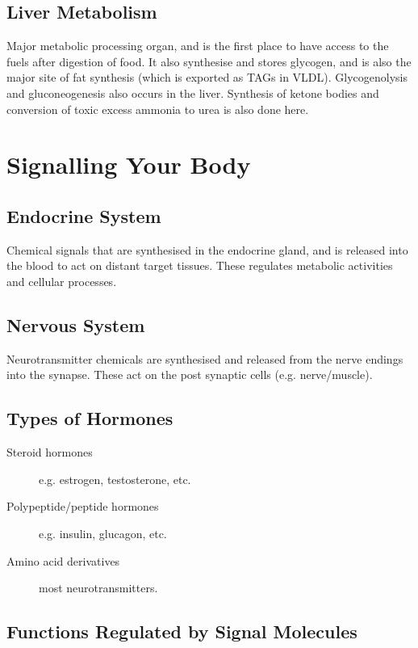 \subsection{Liver Metabolism}

Major metabolic processing organ, and is the first place to have access to the fuels after digestion of food.
It also synthesise and stores glycogen, and is also the major site of fat synthesis (which is exported as TAGs in VLDL).
Glycogenolysis and gluconeogenesis also occurs in the liver.
Synthesis of ketone bodies and conversion of toxic excess ammonia to urea is also done here.

\section{Signalling Your Body}

\subsection{Endocrine System}

Chemical signals that are synthesised in the endocrine gland, and is released into the blood to act on distant target tissues.
These regulates metabolic activities and cellular processes.

\subsection{Nervous System}

Neurotransmitter chemicals are synthesised and released from the nerve endings into the synapse.
These act on the post synaptic cells (e.g. nerve/muscle).

\subsection{Types of Hormones}

\begin{description}
\item[Steroid hormones] e.g. estrogen, testosterone, etc.
\item[Polypeptide/peptide hormones] e.g. insulin, glucagon, etc.
\item[Amino acid derivatives] most neurotransmitters.
\end{description}

\subsection{Functions Regulated by Signal Molecules}

